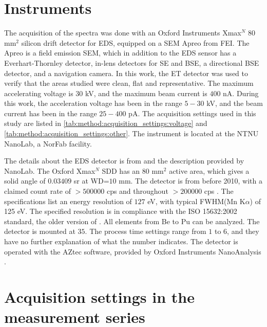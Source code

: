 \section{Instruments}
\label{method:instruments}

The acquisition of the spectra was done with an Oxford Instruments Xmax$^N$ $80$ mm$^2$ silicon drift detector for EDS, equipped on a SEM Apreo from FEI.
The Apreo is a field emission SEM, which in addition to the EDS sensor has a Everhart-Thornley detector, in-lens detectors for SE and BSE, a directional BSE detector, and a navigation camera.
In this work, the ET detector was used to verify that the areas studied were clean, flat and representative.
The maximum accelerating voltage is $30$ kV, and the maximum beam current is $400$ nA.
During this work, the acceleration voltage has been in the range $5-30$ kV, and the beam current has been in the range $25-400$ pA.
The acquisition settings used in this study are listed in \cref{tab:method:acquisition_settings:voltage} and \cref{tab:method:acquisition_settings:other}.
The instrument is located at the NTNU NanoLab, a NorFab facility.

The details about the EDS detector is from \cite{oxford_xmax_80} and the description provided by NanoLab.
The Oxford Xmax$^N$ SDD has an $80$ mm$^2$ active area, which gives a solid angle of $0.03409$ sr at WD=$10$ mm.
The detector is from before 2010, with a claimed count rate of $> 500000$ cps and throughout $> 200000$ cps \cite{oxford_xmax_80}.
The specifications list an energy resolution of $127$ eV, with typical FWHM(Mn K$\alpha$) of 125 eV.
The specified resolution is in compliance with the ISO 15632:2002 standard, the older version of \cite{iso_qc_15632}.
All elements from Be to Pu can be analyzed.
The detector is mounted at $35$\textdegree.
The process time settings range from $1$ to $6$, and they have no further explanation of what the number indicates.
The detector is operated with the AZtec software, provided by Oxford Instruments NanoAnalysis \cite{aztec_manual}.



\section{Acquisition settings in the measurement series}
\label{method:acquisition_settings}


